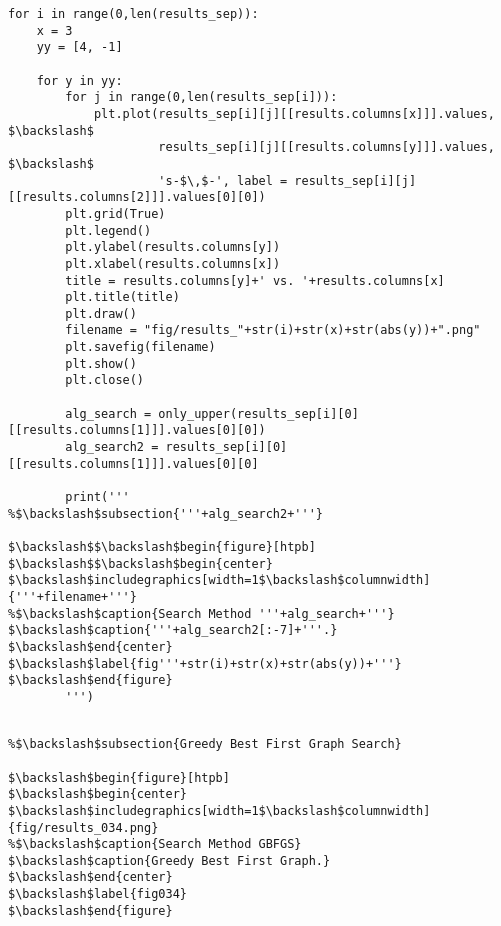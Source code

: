 \documentclass{article}
\begin{document}
    
\begin{verbatim}for i in range(0,len(results_sep)):
    x = 3
    yy = [4, -1]

    for y in yy:
        for j in range(0,len(results_sep[i])):
            plt.plot(results_sep[i][j][[results.columns[x]]].values, $\backslash$
                     results_sep[i][j][[results.columns[y]]].values, $\backslash$
                     's-$\,$-', label = results_sep[i][j][[results.columns[2]]].values[0][0])
        plt.grid(True)
        plt.legend()
        plt.ylabel(results.columns[y])
        plt.xlabel(results.columns[x])
        title = results.columns[y]+' vs. '+results.columns[x]
        plt.title(title)
        plt.draw()
        filename = "fig/results_"+str(i)+str(x)+str(abs(y))+".png"
        plt.savefig(filename)
        plt.show()
        plt.close()
        
        alg_search = only_upper(results_sep[i][0][[results.columns[1]]].values[0][0])
        alg_search2 = results_sep[i][0][[results.columns[1]]].values[0][0]

        print('''
%$\backslash$subsection{'''+alg_search2+'''}

$\backslash$$\backslash$begin{figure}[htpb]
$\backslash$$\backslash$begin{center}
$\backslash$includegraphics[width=1$\backslash$columnwidth]{'''+filename+'''}
%$\backslash$caption{Search Method '''+alg_search+'''}
$\backslash$caption{'''+alg_search2[:-7]+'''.}
$\backslash$end{center}
$\backslash$label{fig'''+str(i)+str(x)+str(abs(y))+'''}
$\backslash$end{figure}
        ''')
        
\end{verbatim}




























\begin{verbatim}
%$\backslash$subsection{Greedy Best First Graph Search}

$\backslash$begin{figure}[htpb]
$\backslash$begin{center}
$\backslash$includegraphics[width=1$\backslash$columnwidth]{fig/results_034.png}
%$\backslash$caption{Search Method GBFGS}
$\backslash$caption{Greedy Best First Graph.}
$\backslash$end{center}
$\backslash$label{fig034}
$\backslash$end{figure}
        
\end{verbatim}
\end{document}
